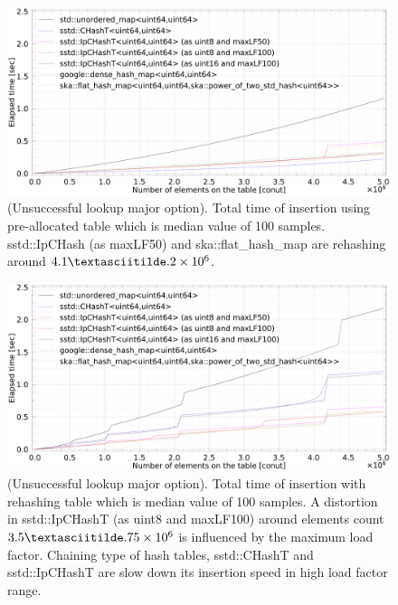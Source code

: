 \begin{figure}[h]
  \includegraphics[scale=0.24]{./fig_bench/insert_et_preAlloc_med.pdf}
  \caption{
    (Unsuccessful lookup major option). Total time of insertion using pre-allocated table which is median value of 100 samples.
    sstd::IpCHash (as maxLF50) and ska::flat\_hash\_map are rehashing around $4.1\textasciitilde.2\times10^6$.
  }
  \label{fig_bench_insert_preAlloc_um}
\end{figure}

\begin{figure}[h]
  \includegraphics[scale=0.24]{./fig_bench/insert_et_med.pdf}
  \caption{
    (Unsuccessful lookup major option). Total time of insertion with rehashing table which is median value of 100 samples.
    A distortion in sstd::IpCHashT (as uint8 and maxLF100) around elements count $3.5 \textasciitilde.75\times10^6$ is influenced by the maximum load factor.
    Chaining type of hash tables, sstd::CHashT and sstd::IpCHashT are slow down its insertion speed in high load factor range.
  }
  \label{fig_bench_insert_wRehash_um}
\end{figure}

